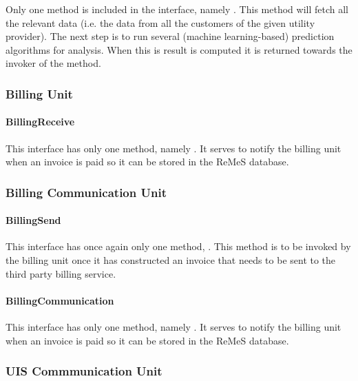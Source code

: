 \npar Only one method is included in the  interface,
namely . This
method will fetch all the relevant data (i.e. the data from all the customers of
the given utility provider). The next step is to run several (machine
learning-based) prediction algorithms for analysis. When this is result is
computed it is returned towards the invoker of the method.

\subsubsection{Billing Unit}

\paragraph{BillingReceive}

\npar This interface has only one method, namely . It serves to notify the billing unit when an invoice is paid so
it can be stored in the ReMeS database.

\subsubsection{Billing Communication Unit}

\paragraph{BillingSend}

\npar This interface has once again only one method, . This method is to be invoked by the billing unit once it has constructed
an invoice that needs to be sent to the third party billing service.

\paragraph{BillingCommunication}

\npar This interface has only one method, namely . It serves to notify the billing unit when an invoice is paid so
it can be stored in the ReMeS database.

\subsubsection{UIS Commmunication Unit}

